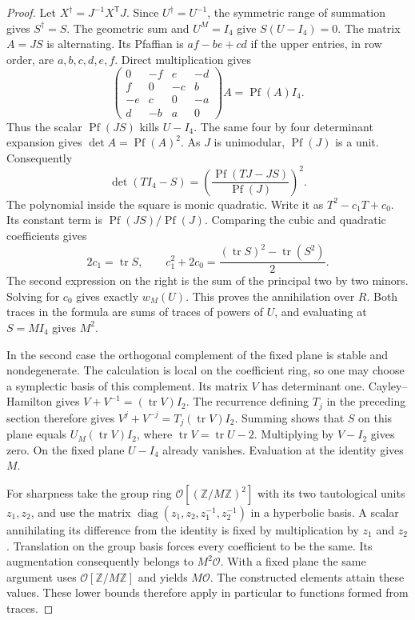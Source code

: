 \documentclass[a4paper,11pt]{article}
\theoremstyle{definition}
\theoremstyle{remark}
\newcommand{\ZZ}{\mathbb Z}\newcommand{\ord}{\operatorname{ord}}
\numberwithin{equation}{section}
\begin{document}
\begin{proof}
Let \(X^\dagger=J^{-1}X^{\mathsf T}J\). Since
\(U^\dagger=U^{-1}\), the symmetric range of summation gives
\(S^\dagger=S\). The geometric sum and \(U^M=I_4\) give
\(S(U-I_4)=0\). The matrix \(A=JS\) is alternating.
Its Pfaffian is \(af-be+cd\) if the upper entries, in row
order, are \(a,b,c,d,e,f\). Direct multiplication gives
\[
 \begin{pmatrix}
 0&-f&e&-d\\ f&0&-c&b\\-e&c&0&-a\\ d&-b&a&0
 \end{pmatrix} A=\operatorname{Pf}(A) I_4 .
\]
Thus the scalar \(\operatorname{Pf}(JS)\) kills \(U-I_4\).
The same four by four determinant expansion gives
\(\det A=\operatorname{Pf}(A)^2\).
As \(J\) is unimodular, \(\operatorname{Pf}(J)\) is a unit.
Consequently
\[
 \det(TI_4-S)=
       \left(\frac{\operatorname{Pf}(TJ-JS)}
                         {\operatorname{Pf}(J)}\right)^2 .
\]
The polynomial inside the square is monic quadratic. Write
it as \(T^2-c_1T+c_0\). Its constant term is
\(\operatorname{Pf}(JS)/\operatorname{Pf}(J)\). Comparing
the cubic and quadratic coefficients gives
\[
 2c_1=\operatorname{tr}S,\qquad
 c_1^2+2c_0=
       \frac{(\operatorname{tr}S)^2-\operatorname{tr}(S^2)}2.
\]
The second expression on the right is the sum of the principal
two by two minors. Solving for \(c_0\) gives exactly \(w_M(U)\).
This proves the annihilation over \(R\). Both traces in the
formula are sums of traces of powers of \(U\), and evaluating
at \(S=MI_4\) gives \(M^2\).

In the second case the orthogonal complement of the fixed plane
is stable and nondegenerate. The calculation is local on the
coefficient ring, so one may choose a symplectic basis of this
complement. Its matrix \(V\) has determinant one.
Cayley--Hamilton gives \(V+V^{-1}=(\operatorname{tr}V)I_2\).
The recurrence defining \(T_j\) in the preceding section
therefore gives
\(V^j+V^{-j}=T_j(\operatorname{tr}V)I_2\).
Summing shows that \(S\) on this plane equals
\(U_M(\operatorname{tr}V)I_2\), where
\(\operatorname{tr}V=\operatorname{tr}U-2\). Multiplying
by \(V-I_2\) gives zero. On the fixed plane \(U-I_4\)
already vanishes. Evaluation at the identity gives \(M\).

For sharpness take the group ring
\(\mathcal O[(\ZZ/M\ZZ)^2]\) with its two tautological units
\(z_1,z_2\), and use the matrix
\(\operatorname{diag}(z_1,z_2,z_1^{-1},z_2^{-1})\) in a
hyperbolic basis. A scalar annihilating its difference from
the identity is fixed by multiplication by \(z_1\) and
\(z_2\). Translation on the group basis forces every
coefficient to be the same. Its augmentation consequently
belongs to \(M^2\mathcal O\). With a fixed plane the same
argument uses \(\mathcal O[\ZZ/M\ZZ]\) and yields
\(M\mathcal O\). The constructed elements attain these
values. These lower bounds therefore apply in particular
to functions formed from traces.
\end{proof}
\end{document}
